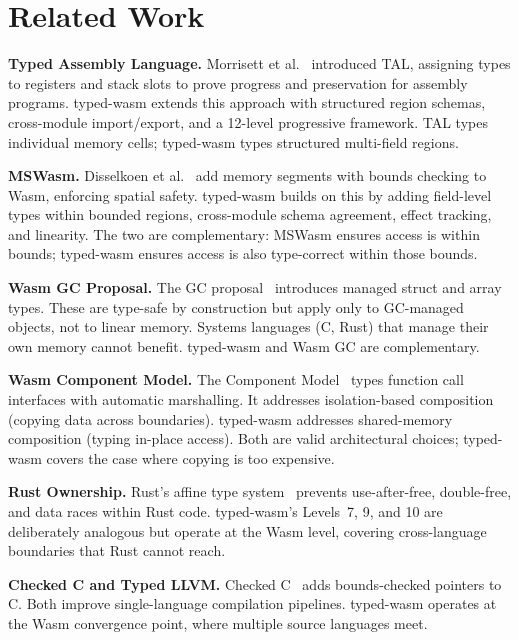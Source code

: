 \documentclass[sigplan,nonacm,screen]{acmart}
\begin{document}
\section{Related Work}
\label{sec:related}

\textbf{Typed Assembly Language.}
Morrisett et al.~\cite{morrisett1999} introduced TAL, assigning types to
registers and stack slots to prove progress and preservation for assembly
programs. typed-wasm extends this approach with structured region schemas,
cross-module import/export, and a 12-level progressive framework. TAL
types individual memory cells; typed-wasm types structured multi-field
regions.

\textbf{MSWasm.}
Disselkoen et al.~\cite{disselkoen2022} add memory segments with bounds
checking to Wasm, enforcing spatial safety. typed-wasm builds on this by
adding field-level types within bounded regions, cross-module schema
agreement, effect tracking, and linearity. The two are complementary:
MSWasm ensures access is within bounds; typed-wasm ensures access is also
type-correct within those bounds.

\textbf{Wasm GC Proposal.}
The GC proposal~\cite{wasmgc2024} introduces managed struct and array
types. These are type-safe by construction but apply only to GC-managed
objects, not to linear memory. Systems languages (C, Rust) that manage
their own memory cannot benefit. typed-wasm and Wasm GC are complementary.

\textbf{Wasm Component Model.}
The Component Model~\cite{wasmcomponent2024} types function call interfaces
with automatic marshalling. It addresses isolation-based composition
(copying data across boundaries). typed-wasm addresses shared-memory
composition (typing in-place access). Both are valid architectural choices;
typed-wasm covers the case where copying is too expensive.

\textbf{Rust Ownership.}
Rust's affine type system~\cite{jung2018} prevents use-after-free,
double-free, and data races within Rust code. typed-wasm's Levels~7, 9,
and 10 are deliberately analogous but operate at the Wasm level, covering
cross-language boundaries that Rust cannot reach.

\textbf{Checked C and Typed LLVM.}
Checked C~\cite{elliott2018} adds bounds-checked pointers to C. Both
improve single-language compilation pipelines. typed-wasm operates at the
Wasm convergence point, where multiple source languages meet.
\end{document}
